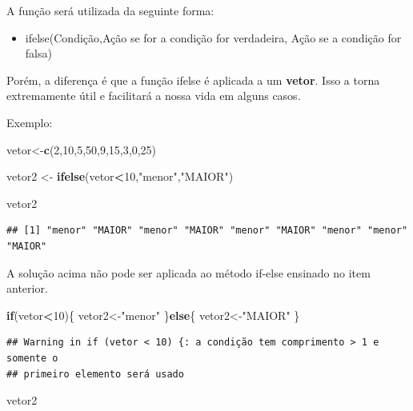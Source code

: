 \documentclass[
]{book}
\newenvironment{Shaded}{\begin{snugshade}}{\end{snugshade}}
\newcommand{\ControlFlowTok}[1]{\textcolor[rgb]{0.13,0.29,0.53}{\textbf{#1}}}
\newcommand{\DecValTok}[1]{\textcolor[rgb]{0.00,0.00,0.81}{#1}}
\newcommand{\KeywordTok}[1]{\textcolor[rgb]{0.13,0.29,0.53}{\textbf{#1}}}
\newcommand{\NormalTok}[1]{#1}
\newcommand{\OperatorTok}[1]{\textcolor[rgb]{0.81,0.36,0.00}{\textbf{#1}}}
\newcommand{\StringTok}[1]{\textcolor[rgb]{0.31,0.60,0.02}{#1}}
\providecommand{\tightlist}{%
  \setlength{\itemsep}{0pt}\setlength{\parskip}{0pt}}
\begin{document}
A função será utilizada da seguinte forma:

\begin{itemize}
\tightlist
\item
  ifelse(Condição,Ação se for a condição for verdadeira, Ação se a
  condição for falsa)
\end{itemize}

Porém, a diferença é que a função ifelse é aplicada a um \textbf{vetor}.
Isso a torna extremamente útil e facilitará a nossa vida em alguns
casos.

Exemplo:

\begin{Shaded}
\begin{Highlighting}[]
\NormalTok{vetor<-}\KeywordTok{c}\NormalTok{(}\DecValTok{2}\NormalTok{,}\DecValTok{10}\NormalTok{,}\DecValTok{5}\NormalTok{,}\DecValTok{50}\NormalTok{,}\DecValTok{9}\NormalTok{,}\DecValTok{15}\NormalTok{,}\DecValTok{3}\NormalTok{,}\DecValTok{0}\NormalTok{,}\DecValTok{25}\NormalTok{)}

\NormalTok{vetor2 <-}\StringTok{ }\KeywordTok{ifelse}\NormalTok{(vetor}\OperatorTok{<}\DecValTok{10}\NormalTok{,}\StringTok{"menor"}\NormalTok{,}\StringTok{"MAIOR"}\NormalTok{)}

\NormalTok{vetor2}
\end{Highlighting}
\end{Shaded}

\begin{verbatim}
## [1] "menor" "MAIOR" "menor" "MAIOR" "menor" "MAIOR" "menor" "menor" "MAIOR"
\end{verbatim}

A solução acima não pode ser aplicada ao método if-else ensinado no item
anterior.

\begin{Shaded}
\begin{Highlighting}[]
\ControlFlowTok{if}\NormalTok{(vetor}\OperatorTok{<}\DecValTok{10}\NormalTok{)\{}
\NormalTok{  vetor2<-}\StringTok{"menor"}
\NormalTok{\}}\ControlFlowTok{else}\NormalTok{\{}
\NormalTok{  vetor2<-}\StringTok{"MAIOR"}
\NormalTok{\}}
\end{Highlighting}
\end{Shaded}

\begin{verbatim}
## Warning in if (vetor < 10) {: a condição tem comprimento > 1 e somente o
## primeiro elemento será usado
\end{verbatim}

\begin{Shaded}
\begin{Highlighting}[]
\NormalTok{vetor2  }
\end{Highlighting}
\end{Shaded}
\end{document}
